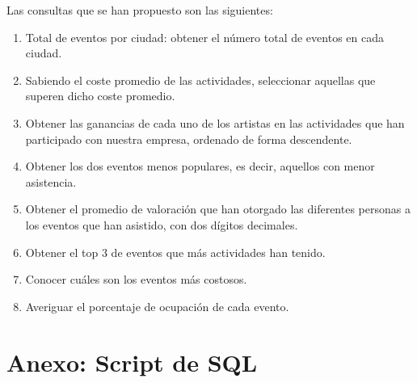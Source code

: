 \documentclass[a4paper,onecolumn]{article}
\let\stdsection\section
\renewcommand\section{\newpage\stdsection}
\begin{document}
\begin{sloppypar}
Las consultas que se han propuesto son las siguientes:
\begin{enumerate}
    \item Total de eventos por ciudad: obtener el número total de eventos en cada ciudad.
    \item Sabiendo el coste promedio de las actividades, seleccionar aquellas que superen dicho coste promedio.
    \item Obtener las ganancias de cada uno de los artistas en las actividades que han participado con nuestra empresa, ordenado de forma descendente.
    \item Obtener los dos eventos menos populares, es decir, aquellos con menor asistencia.
    \item Obtener el promedio de valoración que han otorgado las diferentes personas a los eventos que han asistido, con dos dígitos decimales.
    \item Obtener el top 3 de eventos que más actividades han tenido.
    \item Conocer cuáles son los eventos más costosos.
    \item Averiguar el porcentaje de ocupación de cada evento.
\end{enumerate}

\newpage

\appendix
\section{Anexo: Script de SQL}\label{anexo1}


\end{sloppypar}
\end{document}
